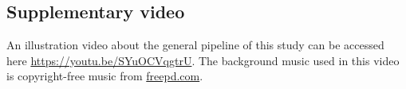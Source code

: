 









\appendixsection



\subsection{Supplementary video}
\label{spp:video}

An illustration video about the general pipeline of this study can be accessed here \url{https://youtu.be/SYuOCVqgtrU}. The background music used in this video is copyright-free music from \url{freepd.com}.

